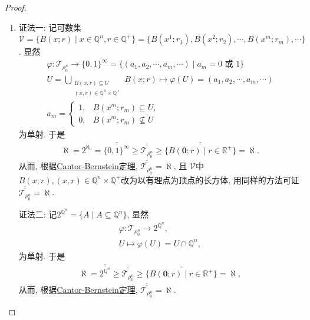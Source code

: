 \documentclass[../../main.tex]{subfiles}%
\begin{document}
\begin{proof}
\begin{enumerate}[(1)]
\item {\color{blue}证法一:}
记可数集$\mathscr{V}=\{B(x; r)\mid x\in \mathbb{Q}^n, r\in \mathbb{Q}^+\}=\{B(x^1; r_1),B(x^2; r_2),\cdots,B(x^m; r_m),\cdots\}$. 显然
\begin{gather*}
\varphi: \mathscr{T}_{\rho_0^n} \to \{0,1\}^\infty = \{(a_1,a_2,\cdots,a_m,\cdots)\mid a_m = 0\text{ 或 }1\} \\
U = \bigcup_{\substack{B(x,r)\subseteq U \\ (x,r)\in \mathbb{Q}^n\times \mathbb{Q}^+}} B(x; r) \mapsto \varphi(U) = (a_1,a_2,\cdots,a_m,\cdots) \\
a_m = \begin{cases}
1, & B(x^m; r_m) \subseteq U, \\
0, & B(x^m; r_m) \nsubseteq U
\end{cases}
\end{gather*}
为单射. 于是
\begin{align*}
\aleph = 2^{\aleph_0} = \overline{\overline{\{0,1\}^\infty}} \geqslant \overline{\overline{\mathscr{T}_{\rho_0^n}}} \geqslant \overline{\overline{\{B(\mathbf{0}; r)\mid r \in \mathbb{R}^+\}}} = \aleph.
\end{align*}
从而, 根据\hyperref[Set Theory-theorem:Cantor-Bernstein定理]{Cantor-Bernstein定理}, $\overline{\overline{\mathscr{T}_{\rho_0^n}}} = \aleph$, 且
$\mathscr{V}$中$B(x; r),(x,r)\in \mathbb{Q}^n \times \mathbb{Q}^+$改为以有理点为顶点的长方体, 用同样的方法可证$\overline{\overline{\mathscr{T}_{\rho_0^n}}} = \aleph$.

{\color{blue}证法二:}
记$2^{\mathbb{Q}^n} = \{A\mid A\subseteq \mathbb{Q}^n\}$, 显然
\begin{gather*}
\varphi: \mathscr{T}_{\rho_0^n} \to 2^{\mathbb{Q}^n}, \\
U \mapsto \varphi(U) = U \cap \mathbb{Q}^n,
\end{gather*}
为单射. 于是
\begin{align*}
\aleph = \overline{\overline{2^{\mathbb{Q}^n}}} \geqslant \overline{\overline{\mathscr{T}_{\rho_0^n}}} \geqslant \overline{\overline{\{B(\mathbf{0}; r)\mid r \in \mathbb{R}^+\}}} = \aleph,
\end{align*}
从而, 根据\hyperref[Set Theory-theorem:Cantor-Bernstein定理]{Cantor-Bernstein定理}, $\overline{\overline{\mathscr{T}_{\rho_0^n}}} = \aleph$.


\end{enumerate}
\end{proof}
\end{document}
